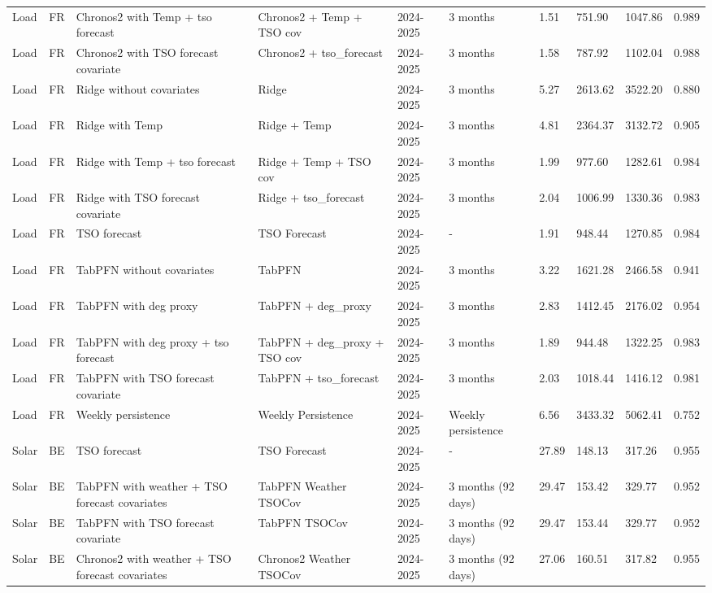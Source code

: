 \begin{longtable}{llllllllll}
Load & FR & Chronos2 with Temp + tso forecast & Chronos2 + Temp + TSO cov & 2024-2025 & 3 months & 1.51 & 751.90 & 1047.86 & 0.989 \\
Load & FR & Chronos2 with TSO forecast covariate & Chronos2 + tso\_forecast & 2024-2025 & 3 months & 1.58 & 787.92 & 1102.04 & 0.988 \\
Load & FR & Ridge without covariates & Ridge & 2024-2025 & 3 months & 5.27 & 2613.62 & 3522.20 & 0.880 \\
Load & FR & Ridge with Temp & Ridge + Temp & 2024-2025 & 3 months & 4.81 & 2364.37 & 3132.72 & 0.905 \\
Load & FR & Ridge with Temp + tso forecast & Ridge + Temp + TSO cov & 2024-2025 & 3 months & 1.99 & 977.60 & 1282.61 & 0.984 \\
Load & FR & Ridge with TSO forecast covariate & Ridge + tso\_forecast & 2024-2025 & 3 months & 2.04 & 1006.99 & 1330.36 & 0.983 \\
Load & FR & TSO forecast & TSO Forecast & 2024-2025 & - & 1.91 & 948.44 & 1270.85 & 0.984 \\
Load & FR & TabPFN without covariates & TabPFN & 2024-2025 & 3 months & 3.22 & 1621.28 & 2466.58 & 0.941 \\
Load & FR & TabPFN with deg proxy & TabPFN + deg\_proxy & 2024-2025 & 3 months & 2.83 & 1412.45 & 2176.02 & 0.954 \\
Load & FR & TabPFN with deg proxy + tso forecast & TabPFN + deg\_proxy + TSO cov & 2024-2025 & 3 months & 1.89 & 944.48 & 1322.25 & 0.983 \\
Load & FR & TabPFN with TSO forecast covariate & TabPFN + tso\_forecast & 2024-2025 & 3 months & 2.03 & 1018.44 & 1416.12 & 0.981 \\
Load & FR & Weekly persistence & Weekly Persistence & 2024-2025 & Weekly persistence & 6.56 & 3433.32 & 5062.41 & 0.752 \\
Solar & BE & TSO forecast & TSO Forecast & 2024-2025 & - & 27.89 & 148.13 & 317.26 & 0.955 \\
Solar & BE & TabPFN with weather + TSO forecast covariates & TabPFN Weather TSOCov & 2024-2025 & 3 months (92 days) & 29.47 & 153.42 & 329.77 & 0.952 \\
Solar & BE & TabPFN with TSO forecast covariate & TabPFN TSOCov & 2024-2025 & 3 months (92 days) & 29.47 & 153.44 & 329.77 & 0.952 \\
Solar & BE & Chronos2 with weather + TSO forecast covariates & Chronos2 Weather TSOCov & 2024-2025 & 3 months (92 days) & 27.06 & 160.51 & 317.82 & 0.955 \\

\end{longtable}
